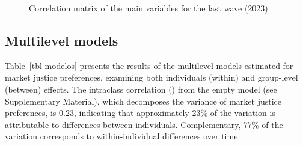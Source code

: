 \documentclass[
  12pt,
]{article}
\begin{document}
\begin{figure}[H]

\caption{\label{fig-matrix}Correlation matrix of the main variables for
the last wave (2023)}


\end{figure}%

\subsection{Multilevel models}\label{multilevel-models}

Table~\ref{tbl-modelos} presents the results of the multilevel models
estimated for market justice preferences, examining both individuals
(within) and group-level (between) effects. The intraclass correlation
()
from the empty model (see Supplementary Material), which decomposes the
variance of market justice preferences, is 0.23, indicating that
approximately 23\% of the variation is attributable to differences
between individuals. Complementary, 77\% of the variation corresponds to
within-individual differences over time.
\end{document}
